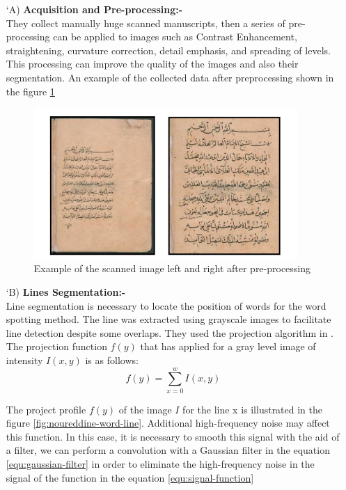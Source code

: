 \begin{itemize}[labelindent=1em,labelsep=0.25cm,leftmargin=*]
        \item[\char `A)] \textbf{Acquisition and Pre-processing:-} \\
        They collect manually huge scanned manuscripts, then a  series of pre-processing can be applied to images such as Contrast Enhancement, straightening, curvature correction, detail emphasis, and spreading of levels. This processing can improve the quality of the images and also their segmentation. An example of the collected data after preprocessing shown in the figure \ref{fig:noureddine-data}
        \begin{figure}[!htb]
            \centering
            \includegraphics[width=10cm]{images/noureddine-data.png}
            \caption{Example of the scanned image left and right after pre-processing}
            \label{fig:noureddine-data}
        \end{figure}
        
        \item[\char `B)] \textbf{Lines Segmentation:-} \\
        Line segmentation is necessary to locate the position of words for the word spotting method. The line was extracted using grayscale images to facilitate line detection despite some overlaps. They used the projection algorithm in \cite{ManmathaProjectionAlgorithm}. The projection function $f(y)$ that has applied for a gray level image of intensity $I(x, y)$ is as follows:
        \begin{equation}
            f(y) = \sum_{x=0}^w I(x, y)
        \end{equation}
        
        The project profile $f(y)$ of the image $I$ for the line x is illustrated in the figure \ref{fig:noureddine-word-line}. Additional high-frequency noise may affect this function. In this case, it is necessary to smooth this signal with the aid of a filter, we can perform a convolution with a Gaussian filter in the equation \ref{equ:gaussian-filter} in order to eliminate the high-frequency noise in the signal of the function in the equation \ref{equ:signal-function}
        

\end{itemize}
